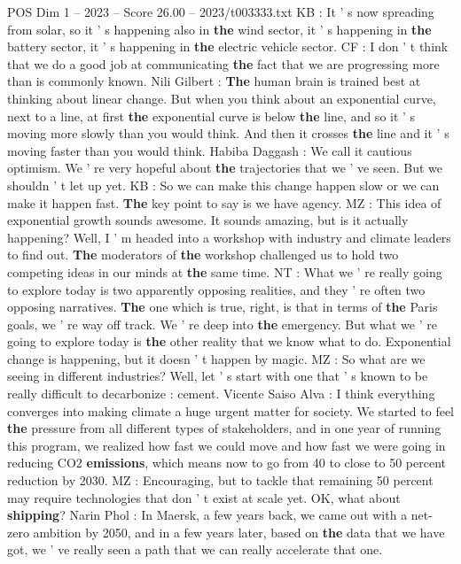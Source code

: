 \begin{textsample}{POS Dim 1 – 2023 – Score 26.00 – 2023/t003333.txt}
KB : It ' s now spreading from solar, so it ' s happening also in \textbf{the} wind sector, it ' s happening in \textbf{the} battery sector, it ' s happening in \textbf{the} electric vehicle sector.
CF : I don ' t think that we do a good job at communicating \textbf{the} fact that we are progressing more than is commonly known.
Nili Gilbert : \textbf{The} human brain is trained best at thinking about linear change.
But when you think about an exponential curve, next to a line, at first \textbf{the} exponential curve is below \textbf{the} line, and so it ' s moving more slowly than you would think.
And then it crosses \textbf{the} line and it ' s moving faster than you would think.
Habiba Daggash : We call it cautious optimism.
We ' re very hopeful about \textbf{the} trajectories that we ' ve seen.
But we shouldn ' t let up yet.
KB : So we can make this change happen slow or we can make it happen fast. \textbf{The} key point to say is we have agency.
MZ : This idea of exponential growth sounds awesome.
It sounds amazing, but is it actually happening?
Well, I ' m headed into a workshop with industry and climate leaders to find out. \textbf{The} moderators of \textbf{the} workshop challenged us to hold two competing ideas in our minds at \textbf{the} same time.
NT : What we ' re really going to explore today is two apparently opposing realities, and they ' re often two opposing narratives. \textbf{The} one which is true, right, is that in terms of \textbf{the} Paris goals, we ' re way off track.
We ' re deep into \textbf{the} emergency.
But what we ' re going to explore today is \textbf{the} other reality that we know what to do.
Exponential change is happening, but it doesn ' t happen by magic.
MZ : So what are we seeing in different industries?
Well, let ' s start with one that ' s known to be really difficult to decarbonize : cement.
Vicente Saiso Alva : I think everything converges into making climate a huge urgent matter for society.
We started to feel \textbf{the} pressure from all different types of stakeholders, and in one year of running this program, we realized how fast we could move and how fast we were going in reducing CO2 \textbf{emissions}, which means now to go from 40 to close to 50 percent reduction by 2030.
MZ : Encouraging, but to tackle that remaining 50 percent may require technologies that don ' t exist at scale yet.
OK, what about \textbf{shipping}?
Narin Phol : In Maersk, a few years back, we came out with a net-zero ambition by 2050, and in a few years later, based on \textbf{the} data that we have got, we ' ve really seen a path that we can really accelerate that one.

\end{textsample}
